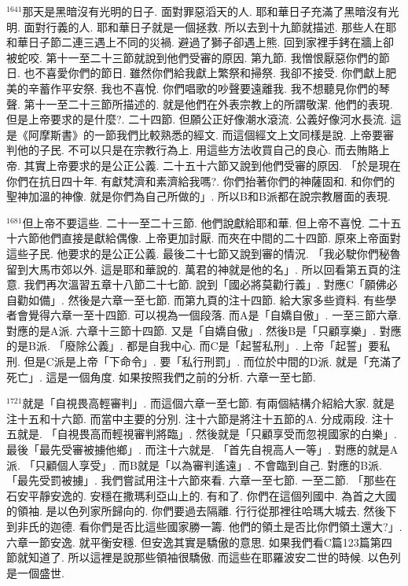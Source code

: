 \documentclass{book}
\begin{document}
$^{1641}$那天是黑暗沒有光明的日子.
面對罪惡滔天的人.
耶和華日子充滿了黑暗沒有光明.
面對行義的人.
耶和華日子就是一個拯救.
所以去到十九節就描述.
那些人在耶和華日子節二連三遇上不同的災禍.
避過了獅子卻遇上熊.
回到家裡手銬在牆上卻被蛇咬.
第十一至二十三節就說到他們受審的原因.
第九節.
我憎恨厭惡你們的節日.
也不喜愛你們的節日.
雖然你們給我獻上繁祭和掃祭.
我卻不接受.
你們獻上肥美的辛蓄作平安祭.
我也不喜悅.
你們唱歌的吵聲要遠離我.
我不想聽見你們的琴聲.
第十一至二十三節所描述的.
就是他們在外表宗教上的所謂敬潔.
他們的表現.
但是上帝要求的是什麼?.
二十四節.
但願公正好像潮水滾流.
公義好像河水長流.
這是《阿摩斯書》的一節我們比較熟悉的經文.
而這個經文上文同樣是說.
上帝要審判他的子民.
不可以只是在宗教行為上.
用這些方法收買自己的良心.
而去賄賂上帝.
其實上帝要求的是公正公義.
二十五十六節又說到他們受審的原因.
「於是現在你們在抗日四十年.
有獻梵濟和素濟給我嗎?.
你們抬著你們的神薩固和.
和你們的聖神加溫的神像.
就是你們為自己所做的」.
所以B和B派都在說宗教層面的表現.

$^{1681}$但上帝不要這些.
二十一至二十三節.
他們說獻給耶和華.
但上帝不喜悅.
二十五十六節他們直接是獻給偶像.
上帝更加討厭.
而夾在中間的二十四節.
原來上帝面對這些子民.
他要求的是公正公義.
最後二十七節又說到審的情況.
「我必駛你們秘魯留到大馬市郊以外.
這是耶和華說的.
萬君的神就是他的名」.
所以回看第五頁的注意.
我們再次溫習五章十八節二十七節.
說到「國必將莫勸行義」.
對應C「願佛必自勸如備」.
然後是六章一至七節.
而第九頁的注十四節.
給大家多些資料.
有些學者會覺得六章一至十四節.
可以視為一個段落.
而A是「自嬌自傲」.
一至三節六章.
對應的是A派.
六章十三節十四節.
又是「自嬌自傲」.
然後B是「只顧享樂」.
對應的是B派.
「廢除公義」.
都是自我中心.
而C是「起誓私刑」.
上帝「起誓」要私刑.
但是C派是上帝「下命令」.
要「私行刑罰」.
而位於中間的D派.
就是「充滿了死亡」.
這是一個角度.
如果按照我們之前的分析.
六章一至七節.

$^{1721}$就是「自視畏高輕審判」.
而這個六章一至七節.
有兩個結構介紹給大家.
就是注十五和十六節.
而當中主要的分別.
注十六節是將注十五節的A.
分成兩段.
注十五就是.
「自視畏高而輕視審判將臨」.
然後就是「只顧享受而忽視國家的白樂」.
最後「最先受審被擄他鄉」.
而注十六就是.
「首先自視高人一等」.
對應的就是A派.
「只顧個人享受」.
而B就是「以為審判遙遠」.
不會臨到自己.
對應的B派.
「最先受罰被擄」.
我們嘗試用注十六節來看.
六章一至七節.
一至二節.
「那些在石安平靜安逸的.
安穩在撒瑪利亞山上的.
有和了.
你們在這個列國中.
為首之大國的領袖.
是以色列家所歸向的.
你們要過去隔離.
行行從那裡往哈瑪大城去.
然後下到非氏的迦德.
看你們是否比這些國家勝一籌.
他們的領土是否比你們領土還大?」.
六章一節安逸.
就平衡安穩.
但安逸其實是驕傲的意思.
如果我們看C篇123篇第四節就知道了.
所以這裡是說那些領袖很驕傲.
而這些在耶羅波安二世的時候.
以色列是一個盛世.
\end{document}
